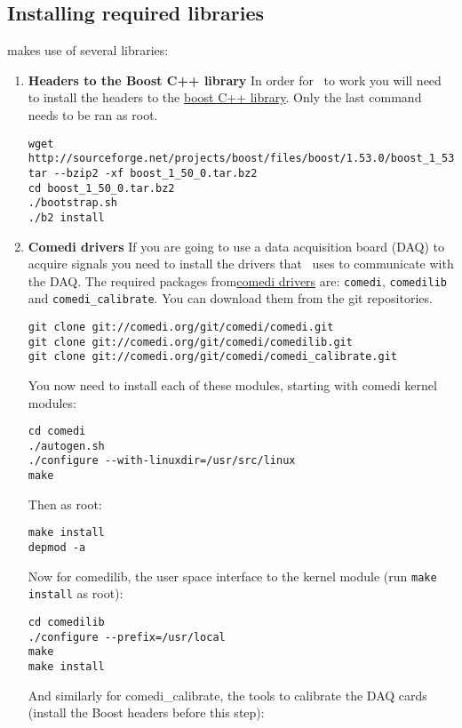 \subsection{Installing required libraries} 
\label{install:required}
\textbf{\progname} makes use of several libraries:
\begin{enumerate}
	\label{install:boost}
	\item \textbf{Headers to the Boost C++ library}
	In order for \progname\ to work you will need to install the headers to the \href{http://www.boost.org}{boost C++ library}. Only the last command needs to be ran as root.
\begin{lstlisting}
wget http://sourceforge.net/projects/boost/files/boost/1.53.0/boost_1_53_0.tar.bz2
tar --bzip2 -xf boost_1_50_0.tar.bz2
cd boost_1_50_0.tar.bz2
./bootstrap.sh
./b2 install
\end{lstlisting}

	\item \textbf{Comedi drivers}
If you are going to use a data acquisition board (DAQ) to acquire signals you need to install the drivers that \progname\ uses to communicate with the DAQ. The required packages from\href{http://www.comedi.org}{comedi drivers} are: \texttt{comedi}, \texttt{comedilib} and \texttt{comedi\_calibrate}. You can download them from the git repositories.
\begin{lstlisting}
git clone git://comedi.org/git/comedi/comedi.git
git clone git://comedi.org/git/comedi/comedilib.git
git clone git://comedi.org/git/comedi/comedi_calibrate.git
\end{lstlisting}
You now need to install each of these modules, starting with comedi kernel modules:

\begin{lstlisting}
cd comedi
./autogen.sh
./configure --with-linuxdir=/usr/src/linux
make
\end{lstlisting}
Then as root:

\begin{lstlisting}
make install
depmod -a
\end{lstlisting}
Now for comedilib, the user space interface to the kernel module (run \texttt{make install} as root):

\begin{lstlisting}
cd comedilib
./configure --prefix=/usr/local
make
make install
\end{lstlisting}
And similarly for comedi\_calibrate, the tools to calibrate the DAQ cards (install the Boost headers before this step):


\end{enumerate}
